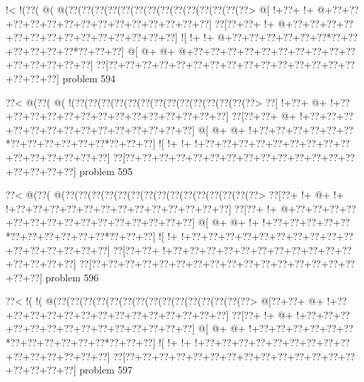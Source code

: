 \vbox{\vbox{\goo
\- !<\- !(\0??(\- @(\- @(\0??(\0??(\0??(\0??(\0??(\0??(\0??(\0??(\0??(\0??(\0??(\0??(\0??(\0??>
\- @[\- !+\0??+\- !+\- @+\0??+\0??+\0??+\0??+\0??+\0??+\0??+\0??+\0??+\0??+\0??+\0??+\0??+\0??]
\0??[\0??+\0??+\- !+\- @+\0??+\0??+\0??+\0??+\0??+\0??+\0??+\0??+\0??+\0??+\0??+\0??+\0??+\0??]
\- ![\- !+\- !+\- @+\0??+\0??+\0??+\0??+\0??+\0??*\0??+\0??+\0??+\0??+\0??+\0??*\0??+\0??+\0??]
\- @[\- @+\- @+\- @+\0??+\0??+\0??+\0??+\0??+\0??+\0??+\0??+\0??+\0??+\0??+\0??+\0??+\0??+\0??]
\0??[\0??+\0??+\0??+\0??+\0??+\0??+\0??+\0??+\0??+\0??+\0??+\0??+\0??+\0??+\0??+\0??+\0??+\0??]
}
\hfil problem 594\hfil\break
}



\vbox{\vbox{\goo
\0??<\- @(\0??(\- @(\- !(\0??(\0??(\0??(\0??(\0??(\0??(\0??(\0??(\0??(\0??(\0??(\0??(\0??(\0??>
\0??[\- !+\0??+\- @+\- !+\0??+\0??+\0??+\0??+\0??+\0??+\0??+\0??+\0??+\0??+\0??+\0??+\0??+\0??]
\0??[\0??+\0??+\- @+\- !+\0??+\0??+\0??+\0??+\0??+\0??+\0??+\0??+\0??+\0??+\0??+\0??+\0??+\0??]
\- @[\- @+\- @+\- !+\0??+\0??+\0??+\0??+\0??+\0??*\0??+\0??+\0??+\0??+\0??+\0??*\0??+\0??+\0??]
\- ![\- !+\- !+\- !+\0??+\0??+\0??+\0??+\0??+\0??+\0??+\0??+\0??+\0??+\0??+\0??+\0??+\0??+\0??]
\0??[\0??+\0??+\0??+\0??+\0??+\0??+\0??+\0??+\0??+\0??+\0??+\0??+\0??+\0??+\0??+\0??+\0??+\0??]
}
\hfil problem 595\hfil\break
}



\vbox{\vbox{\goo
\0??<\- @(\0??(\- @(\0??(\0??(\0??(\0??(\0??(\0??(\0??(\0??(\0??(\0??(\0??(\0??(\0??(\0??(\0??>
\0??[\0??+\- !+\- @+\- !+\- !+\0??+\0??+\0??+\0??+\0??+\0??+\0??+\0??+\0??+\0??+\0??+\0??+\0??]
\0??[\0??+\- !+\- @+\0??+\0??+\0??+\0??+\0??+\0??+\0??+\0??+\0??+\0??+\0??+\0??+\0??+\0??+\0??]
\- @[\- @+\- @+\- !+\- !+\0??+\0??+\0??+\0??+\0??*\0??+\0??+\0??+\0??+\0??+\0??*\0??+\0??+\0??]
\- ![\- !+\- !+\0??+\0??+\0??+\0??+\0??+\0??+\0??+\0??+\0??+\0??+\0??+\0??+\0??+\0??+\0??+\0??]
\0??[\0??+\0??+\- !+\0??+\0??+\0??+\0??+\0??+\0??+\0??+\0??+\0??+\0??+\0??+\0??+\0??+\0??+\0??]
\0??[\0??+\0??+\0??+\0??+\0??+\0??+\0??+\0??+\0??+\0??+\0??+\0??+\0??+\0??+\0??+\0??+\0??+\0??]
}
\hfil problem 596\hfil\break
}



\vbox{\vbox{\goo
\0??<\- !(\- !(\- @(\0??(\0??(\0??(\0??(\0??(\0??(\0??(\0??(\0??(\0??(\0??(\0??(\0??(\0??(\0??>
\- @[\0??+\0??+\- @+\- !+\0??+\0??+\0??+\0??+\0??+\0??+\0??+\0??+\0??+\0??+\0??+\0??+\0??+\0??]
\0??[\0??+\- !+\- @+\- !+\0??+\0??+\0??+\0??+\0??+\0??+\0??+\0??+\0??+\0??+\0??+\0??+\0??+\0??]
\- @[\- @+\- @+\- !+\0??+\0??+\0??+\0??+\0??+\0??*\0??+\0??+\0??+\0??+\0??+\0??*\0??+\0??+\0??]
\- ![\- !+\- !+\- !+\0??+\0??+\0??+\0??+\0??+\0??+\0??+\0??+\0??+\0??+\0??+\0??+\0??+\0??+\0??]
\0??[\0??+\0??+\0??+\0??+\0??+\0??+\0??+\0??+\0??+\0??+\0??+\0??+\0??+\0??+\0??+\0??+\0??+\0??]
}
\hfil problem 597\hfil\break
}



